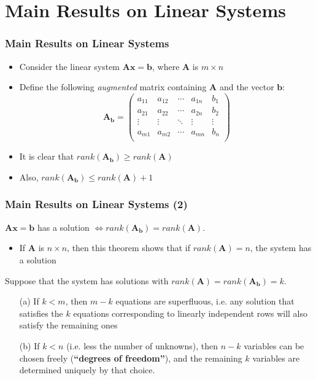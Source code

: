 \documentclass[10pt]{beamer}
\theoremstyle{definition}
\begin{document}
\section{Main Results on Linear Systems}
\begin{frame}[fragile]
\frametitle{Main Results on Linear Systems}
\begin{itemize}
	\item Consider the linear system $\mathbf{Ax = b}$, where $\mathbf{A}$ is $m\times n$
	\item Define the following \textit{augmented} matrix containing $\mathbf{A}$ and the vector $\mathbf{b}$:
	\[
		\mathbf{A_{b}} = 
		\begin{pmatrix}
			a_{11} & a_{12} & \cdots & a_{1n} & b_{1}\\
			a_{21} & a_{22} & \cdots & a_{2n} & b_{2}\\
			\vdots & \vdots & \ddots & \vdots & \vdots\\
			a_{m1} & a_{m2} & \cdots & a_{mn} & b_{n}\\
		\end{pmatrix}
	\]
	\item It is clear that $rank(\mathbf{A_{b}}) \geq rank(\mathbf{A})$
	\item Also, $rank(\mathbf{A_{b}}) \leq rank(\mathbf{A}) + 1$
\end{itemize}
\end{frame}

\begin{frame}[fragile]
\frametitle{Main Results on Linear Systems (2)}
\begin{theorem}
	$\mathbf{Ax = b}$ has a solution $\Leftrightarrow rank(\mathbf{A_{b}}) = rank(\mathbf{A})$.
\end{theorem}
\begin{itemize}
	\item If $\mathbf{A}$ is $n\times n$, then this theorem shows that if $rank(\mathbf{A}) = n$, the system has a solution
\end{itemize}
\begin{theorem}
	Suppose that the system has solutions with $rank(\mathbf{A}) = rank(\mathbf{A_{b}}) = k$.
	\begin{itemize}
		\item[(a)] If $k < m$, then $m - k$ equations are superfluous, i.e. any solution that satisfies the $k$ equations corresponding to linearly independent rows will also satisfy the remaining ones
		\item[(b)] If $k < n$ (i.e. less the number of unknowns), then $n - k$ variables can be chosen freely (\textbf{``degrees of freedom''}), and the remaining $k$ variables are determined uniquely by that choice.
	\end{itemize}
\end{theorem}
\end{frame}
\end{document}
